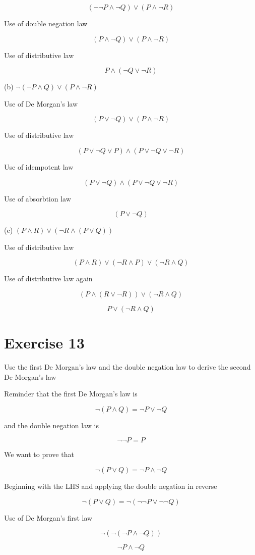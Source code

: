 \documentclass[11pt]{article}
\begin{document}
$$(\neg \neg P \wedge \neg Q) \vee (P \wedge \neg R)$$

Use of double negation law

$$(P \wedge \neg Q) \vee (P \wedge \neg R)$$

Use of distributive law

$$P \wedge (\neg Q \vee \neg R)$$

\noindent (b) $\neg (\neg P \wedge Q) \vee (P \wedge \neg R)$

Use of De Morgan's law

$$(P \vee \neg Q) \vee (P \wedge \neg R)$$

Use of distributive law

$$(P \vee \neg Q \vee P) \wedge (P \vee \neg Q \vee \neg R)$$

Use of idempotent law

$$(P \vee \neg Q) \wedge (P \vee \neg Q \vee \neg R)$$

Use of absorbtion law

$$(P \vee \neg Q)$$

\noindent (c) $(P \wedge R) \vee (\neg R \wedge (P \vee Q))$

Use of distributive law

$$(P \wedge R) \vee (\neg R \wedge P) \vee (\neg R \wedge Q)$$

Use of distributive law again

$$(P \wedge (R \vee \neg R)) \vee (\neg R \wedge Q)$$

$$P \vee (\neg R \wedge Q)$$

\section*{Exercise 13}

Use the first De Morgan's law and the double negation law to derive the second De Morgan's law

Reminder that the first De Morgan's law is

$$\neg (P \wedge Q) = \neg P \vee \neg Q$$

and the double negation law is 

$$\neg \neg P = P$$

We want to prove that 

$$\neg (P \vee Q) = \neg P \wedge \neg Q$$

Beginning with the LHS and applying the double negation in reverse 

$$\neg (P \vee Q) = \neg (\neg \neg P \vee \neg \neg Q)$$

Use of De Morgan's first law

$$\neg(\neg(\neg P \wedge \neg Q))$$

$$\neg P \wedge \neg Q$$
\end{document}
